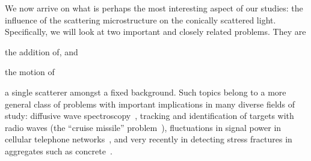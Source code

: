 We now arrive on what is perhaps the most interesting aspect of our
studies: the influence of the scattering microstructure on the conically
scattered light.  Specifically, we will look at two important and closely
related problems.  They are
\begin{inparaenum}[(a)]
\item the addition of, and
\item the motion of
\end{inparaenum}
a single scatterer amongst a fixed background.  Such topics belong to a
more general class of problems with important implications in many diverse
fields of study: diffusive wave spectroscopy~\cite{pine1988diffusing},
tracking and identification of targets with radio waves (the ``cruise
missile'' problem~\cite{atkins1991neural}), fluctuations in signal power in
cellular telephone networks~\cite{abdi2001estimation}, and very recently in
detecting stress fractures in aggregates such as
concrete~\cite{larose2010locating}.
